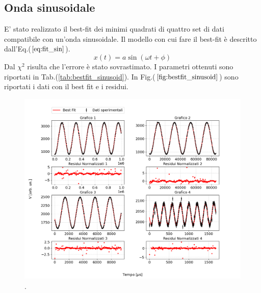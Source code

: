 \documentclass{article}
\begin{document}
    \subsection{Onda sinusoidale}
        E' stato realizzato il best-fit dei minimi quadrati
        di quattro set di dati compatibile con un'onda sinusoidale.
        Il modello con cui fare il best-fit è descritto dall'Eq.($\ref{eq:fit_sin}$).
            \begin{equation}
                x(t)=a \sin\left(\omega t+\phi\right)
                \label{eq:fit_sin}
            \end{equation} 
        Dal $\chi^2$ risulta che l'errore è stato sovrastimato. 
        I parametri ottenuti sono riportati in Tab.(\ref{tab:bestfit_sinusoid}).%
        In Fig.($\ref{fig:bestfit_sinusoid}$) sono riportati i dati con il best fit e 
        i residui.

            \begin{figure}[H]            
                
                \includegraphics[width=1\textwidth]{bestfit_sinusoid.png} %
                \caption{.
                }
                \label{fig:bestfit_sinusoid}
            \end{figure}    
\end{document}
